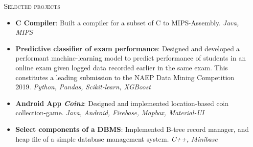 \documentclass[11pt]{article}
\begin{document}
\textsc{Selected projects}
\begin{itemize}
    \item \textbf{C Compiler}:
        Built a compiler for a subset of C to MIPS-Assembly. \textit{Java, MIPS}
    \item \textbf{Predictive classifier of exam performance}:
        Designed and developed a performant machine-learning model to predict performance
        of students in an online exam given logged data recorded earlier in the same exam.
        This constitutes a leading submission to the NAEP Data Mining Competition 2019.
        \textit{Python, Pandas, Scikit-learn, XGBoost}
    \item \textbf{Android App \emph{Coinz}}:
        Designed and implemented location-based coin collection-game. \textit{Java,
        Android, Firebase, Mapbox, Material-UI}
    \item \textbf{Select components of a DBMS}:
        Implemented B-tree record manager, and heap file of a simple database management
        system. \textit{C++, Minibase}
\end{itemize}
\end{document}
